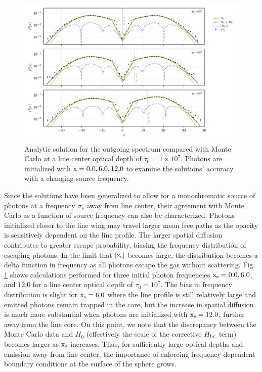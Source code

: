 \documentclass{aastex63}
\begin{document}
 \begin{figure}
    \centering
    \includegraphics{xinit_threepanel.pdf}
    \caption{Analytic solution for the outgoing spectrum compared with Monte Carlo at a line center optical depth of $\tau_0 = 1 \times 10^7$. Photons are initialized with $\rm x = 0.0, 6.0, 12.0$ to examine the solutions' accuracy with a changing source frequency.} 
    \label{fig:sol_mc_xinit}
\end{figure}

Since the solutions have been generalized to allow for a monochromatic source of photons at a frequency $\sigma_s$ away from line center, their agreement with Monte Carlo as a function of source frequency can also be characterized. Photons initialized closer to the line wing may travel larger mean free paths as the opacity is sensitively dependent on the line profile. The larger spatial diffusion contributes to greater escape probability, biasing the frequency distribution of escaping photons. In the limit that $|\rm x_s|$ becomes large, the distribution becomes a delta function in frequency as all photons escape the gas without scattering. Fig. \ref{fig:sol_mc_xinit} shows calculations performed for three initial photon frequencies $\rm x_s = 0.0, 6.0$, and $12.0$ for a line center optical depth of $\tau_0=10^7$. The bias in frequency distribution is slight for $\rm x_s = 6.0$ where the line profile is still relatively large and emitted photons remain trapped in the core, but the increase in spatial diffusion is much more substantial when photons are initialized with $\rm x_s=12.0$, further away from the line core. On this point, we note that the discrepancy between the Monte Carlo data and $H_0$ (effectively the scale of the corrective $H_{\rm bc}$ term) becomes larger as $\rm x_s$ increases. Thus, for sufficiently large optical depths and emission away from line center, the importance of enforcing frequency-dependent boundary conditions at the surface of the sphere grows. %
\end{document}
